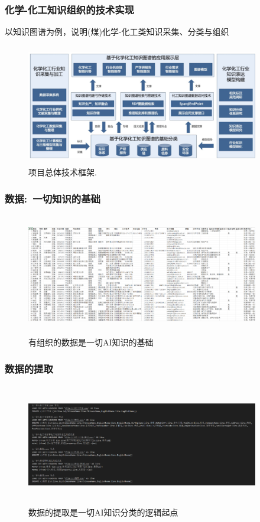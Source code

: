 \begin{frame}
	\frametitle{化学-化工知识组织的技术实现}
	以知识图谱为例，说明(煤)化学-化工类知识采集、分类与组织
\begin{figure}[h!]
\centering
\includegraphics[height=2.08in,width=4.00in,viewport=0 0 245 113,clip]{Figures/KG_Chem-Frame.png}
\caption{\tiny 项目总体技术框架.}%
\label{KG_Chem-Frame}
\end{figure}
\end{frame}

\begin{frame}
	\frametitle{数据:~一切知识的基础}
\begin{figure}[h!]
\centering
\vskip -8pt
\includegraphics[height=2.10in,width=4.00in,viewport=0 0 360 160,clip]{Figures/KG_Chem-Info.png}
\caption{\tiny 有组织的数据是一切\textrm{AI}知识的基础}%
\label{Fig:KG_Chem-Enflurane}
\end{figure}
\end{frame}

\begin{frame}
	\frametitle{数据的提取}
\begin{figure}[h!]
\centering
\includegraphics[height=2.10in,width=4.00in,viewport=0 0 240 130,clip]{Figures/KG_Chem-extract.png}
\caption{\tiny 数据的提取是一切\textrm{AI}知识分类的逻辑起点}%
\label{Fig:KG_Chem-Extract}
\end{figure}
\end{frame}

